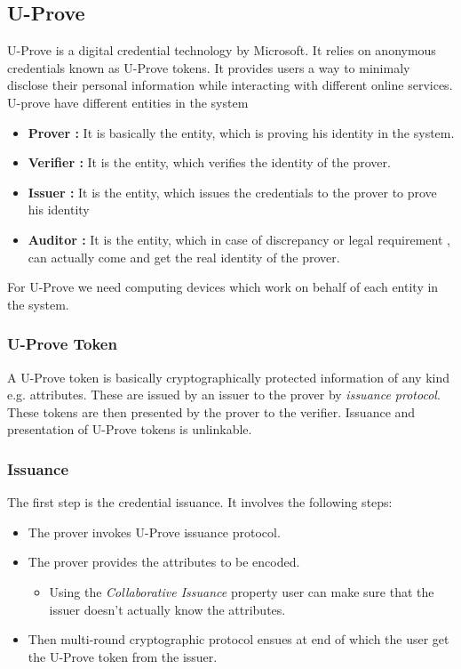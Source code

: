 \subsection{U-Prove}
U-Prove is a digital credential technology by Microsoft\cite{paquin2013u}\cite{paquin2011u}. It relies on anonymous credentials known as U-Prove tokens. It provides users a way to minimaly disclose their personal information while interacting with different online services. U-prove have different entities in the system
\begin{itemize}
	\item \textbf{Prover :} It is basically the entity, which is proving his identity in the system.
	\item \textbf{Verifier :} It is the entity, which verifies the identity of the prover.
	\item \textbf{Issuer :} It is the entity, which issues the credentials to the prover to prove his identity
	\item \textbf{Auditor :} It is the entity, which in case of discrepancy or legal requirement , can actually come and get the real identity of the prover.
\end{itemize}
For U-Prove we need computing devices which work on behalf of each entity in the system.
\subsubsection{U-Prove Token}
A U-Prove token is basically cryptographically protected information of any kind e.g. attributes. These are issued by an issuer to the prover by \textit{issuance protocol}. These tokens are then presented by the prover to the verifier. Issuance and presentation of U-Prove tokens is unlinkable.
\subsubsection{Issuance}
The first step is the credential issuance. It involves the following steps:
\begin{itemize}
	\item The prover invokes U-Prove issuance protocol.
	\item The prover provides the attributes to be encoded.
	\begin{itemize}
	\item Using the \textit{Collaborative Issuance}\cite{paquin2014u} property user can make sure that the issuer doesn’t actually know the attributes.
\end{itemize}
	\item Then multi-round cryptographic protocol ensues at end of which the user get the U-Prove token from the issuer.
\end{itemize}
